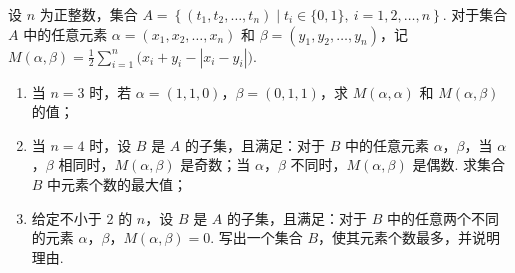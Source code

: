 \begin{problem}
设 \(n\) 为正整数，集合 \(A=\left\{(t_1,t_2,\ldots,t_n)\mid t_i\in\{0,1\},\ i=1,2,\ldots,n\right\}\).
对于集合 \(A\) 中的任意元素 \(\alpha=(x_1,x_2,\ldots,x_n)\) 和 \(\beta=(y_1,y_2,\ldots,y_n)\)，记 \(M(\alpha,\beta)=\frac12\sum_{i=1}^n\bigl(x_i+y_i-|x_i-y_i|\bigr)\).

\begin{enumerate}
    \item 当 \(n=3\) 时，若 \(\alpha=(1,1,0)\)，\(\beta=(0,1,1)\)，求 \(M(\alpha,\alpha)\) 和 \(M(\alpha,\beta)\) 的值；
    \item 当 \(n=4\) 时，设 \(B\) 是 \(A\) 的子集，且满足：对于 \(B\) 中的任意元素 \(\alpha\)，\(\beta\)，当 \(\alpha\)，\(\beta\) 相同时，\(M(\alpha,\beta)\) 是奇数；当 \(\alpha\)，\(\beta\) 不同时，\(M(\alpha,\beta)\) 是偶数. 求集合 \(B\) 中元素个数的最大值；
    \item 给定不小于 \(2\) 的 \(n\)，设 \(B\) 是 \(A\) 的子集，且满足：对于 \(B\) 中的任意两个不同的元素 \(\alpha\)，\(\beta\)，\(M(\alpha,\beta)=0\). 写出一个集合 \(B\)，使其元素个数最多，并说明理由.
\end{enumerate}
\end{problem}

